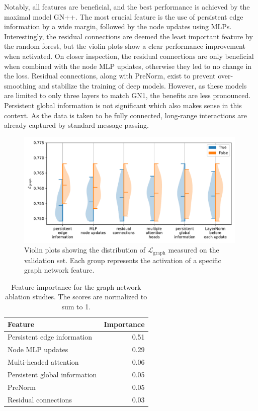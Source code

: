 Notably, all features are beneficial, and the best performance is achieved by the maximal model GN++.
The most crucial feature is the use of persistent edge information by a wide margin, followed by the node updates using MLPs.
Interestingly, the residual connections are deemed the least important feature by the random forest, but the violin plots show a clear performance improvement when activated.
On closer inspection, the residual connections are only beneficial when combined with the node MLP updates, otherwise they led to no change in the loss.
Residual connections, along with PreNorm, exist to prevent over-smoothing and stabilize the training of deep models.
However, as these models are limited to only three layers to match GN1, the benefits are less pronounced.
Persistent global information is not significant which also makes sense in this context.
As the data is taken to be fully connected, long-range interactions are already captured by standard message passing.

\begin{figure}[ht]
    \centering
    \includegraphics[width=0.99\textwidth]{figures/flavour_tagging/violin.pdf}
    \caption{Violin plots showing the distribution of $\mathcal{L}_{\text{graph}}$ measured on the validation set. Each group represents the activation of a specific graph network feature.}
    \label{fig:violin}
\end{figure}

\begin{table}
    \centering
    \begin{tabular}{lr}
        \toprule
        Feature                       & Importance \\
        \midrule
        Persistent edge information   & 0.51       \\
        Node MLP updates              & 0.29       \\
        Multi-headed attention        & 0.06       \\
        Persistent global information & 0.05       \\
        PreNorm                       & 0.05       \\
        Residual connections          & 0.03       \\
        \bottomrule
    \end{tabular}
    \caption{Feature importance for the graph network ablation studies. The scores are normalized to sum to 1.}
    \label{tab:feature_importance}
\end{table}

